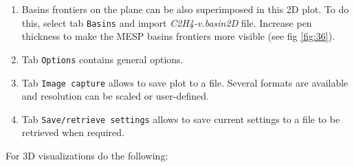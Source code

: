 \documentclass[a4paper,10pt]{article}
\begin{document}
\begin{enumerate}
\item Basins frontiers on the plane can be also superimposed in this 2D plot.
To do this, select tab \texttt{Basins} and import {\it C2H4-v.basin2D} file.
Increase pen thickness to make the MESP basins frontiers more visible (see fig \ref{fig:36}).

\item Tab \texttt{Options} contains general options.

\item Tab \texttt{Image capture} allows to save plot to a file. Several formats
are available and resolution can be scaled or user-defined.

\item Tab \texttt{Save/retrieve settings} allows to save current settings to a file
to be retrieved when required.

\end{enumerate}


For 3D visualizations do the following:
\end{document}
